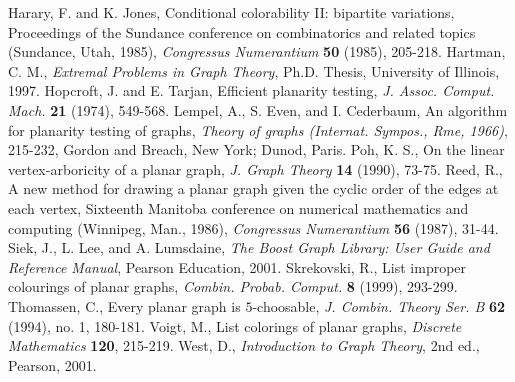 \documentclass[letterpaper, 12pt]{article}
\theoremstyle{definition}
\theoremstyle{definition}
\theoremstyle{thm}
\theoremstyle{definition}
\begin{document}
\begin{thebibliography}{99}
	Harary, F. and K. Jones, Conditional colorability II: bipartite variations,
	Proceedings of the Sundance conference on combinatorics and related topics
	(Sundance, Utah, 1985), \textit{Congressus Numerantium} \textbf{50} (1985),
	205-218.
	Hartman, C. M.,
	\textit{Extremal Problems in Graph Theory}, Ph.D. Thesis, University of Illinois,
	1997.
	Hopcroft, J. and E. Tarjan, Efficient planarity testing, \textit{J. Assoc.
	Comput. Mach.} \textbf{21} (1974), 549-568.
	Lempel, A., S. Even, and I. Cederbaum, An algorithm for planarity testing of
	graphs, \textit{Theory of graphs (Internat. Sympos., Rme, 1966)}, 215-232,
	Gordon and Breach, New York; Dunod, Paris.
	Poh, K. S., On the linear vertex-arboricity of a planar graph,
	\emph{J. Graph Theory} \textbf{14} (1990), 73-75.
	Reed, R., A new method for drawing a planar graph given the cyclic order of the
	edges at each vertex, Sixteenth Manitoba conference on numerical
	mathematics and computing (Winnipeg, Man., 1986), \textit{Congressus
	Numerantium} \textbf{56} (1987), 31-44.
	Siek, J., L. Lee, and A. Lumsdaine, \textit{The Boost Graph Library: User
	Guide and Reference Manual}, Pearson Education, 2001.
	Skrekovski, R., List improper colourings of planar graphs,
	\textit{Combin. Probab. Comput.} \textbf{8} (1999), 293-299.
	Thomassen, C., Every planar graph is $5$-choosable,
	\emph{J. Combin. Theory Ser. B} \textbf{62} (1994), no. 1, 180-181.
	Voigt, M., List colorings of planar graphs,
	\textit{Discrete Mathematics} \textbf{120}, 215-219.
	West, D., \textit{Introduction to Graph Theory},
	2nd ed., Pearson, 2001.
\end{thebibliography}
\end{document}
